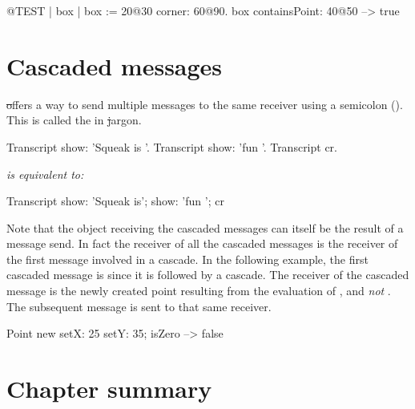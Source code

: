 \documentclass[a4paper,10pt,twoside]{book}
\begin{document}
\begin{code}{@TEST}
| box |
box := 20@30 corner: 60@90.
box containsPoint: 40@50 --> true
\end{code}

\section{Cascaded messages}
\st offers a way to send multiple messages to the same receiver using a semicolon (\ct{;}). This is called the  in \st jargon.


\begin{minipage}{0.3\textwidth}
\begin{code}{}
Transcript show: 'Squeak is '.
Transcript show: 'fun '.
Transcript cr.
\end{code}
\end{minipage}
\emph{is equivalent to:}
\begin{minipage}{0.3\textwidth}
\begin{code}{}
Transcript        
   show: 'Squeak is';
   show: 'fun ';
   cr
\end{code}
\end{minipage}

Note that the object receiving the cascaded messages can itself be the result of a message send. 
In fact the receiver of all the cascaded messages is the receiver of the first message involved in a cascade. In the following example, the first cascaded message is  since it is followed by a cascade. The receiver of the cascaded message  is the newly created point resulting from the evaluation of , and \emph{not} . The subsequent message  is sent to that same receiver. 

\begin{code}{}
Point new setX: 25 setY: 35; isZero --> false
\end{code}

\section{Chapter summary}
\end{document}
